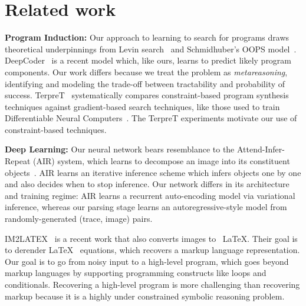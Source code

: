 \documentclass{article}
\theoremstyle{definition}
\begin{document}
\begin{table}[h]

\section{Related work}

\textbf{Program Induction:}
Our approach to learning to search for programs draws theoretical
underpinnings from Levin
search~\citep{levin1973universal,solomonoff1984optimum} and
Schmidhuber's OOPS model~\citep{schmidhuber2004optimal}.
DeepCoder~\citep{BalGauBroetal16} is a recent model which, like ours, learns to predict likely program components.
Our work differs because we treat
the problem as \emph{metareasoning}, identifying and modeling
the trade-off between tractability and probability of success.
TerpreT~\citep{gaunt2016terpret} 
systematically compares constraint-based program synthesis techniques
against gradient-based search techniques, like those used to train
Differentiable Neural Computers~\citep{graves2016hybrid}.  The TerpreT
experiments motivate our use of constraint-based techniques.



\textbf{Deep Learning:} Our neural network bears resemblance to the Attend-Infer-Repeat (AIR) system, which learns to decompose an image into its constituent objects~\citep{eslami1603attend}. AIR learns an iterative inference scheme which infers objects one by one and also decides when to stop inference.
Our network  differs in its architecture and training regime: AIR learns a recurrent auto-encoding model via variational inference, whereas our parsing stage learns an autoregressive-style model from randomly-generated (trace, image) pairs.

IM2LATEX~\citep{im2latex} is a recent work that also converts images to
~\LaTeX.
Their goal is to derender  \LaTeX~ equations,
which recovers a markup language representation.
Our goal is to go from
noisy input to a high-level program,
which goes beyond markup languages by supporting
programming constructs like loops and conditionals.
Recovering a high-level program is more challenging than recovering markup
because it is a highly under constrained symbolic reasoning problem.



\end{table}
\end{document}
